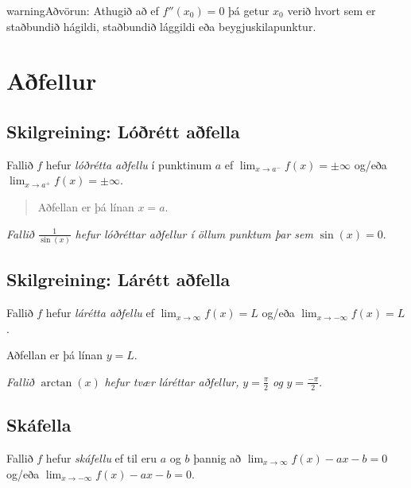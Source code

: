 \documentclass[a4paper,10pt,icelandic]{sphinxmanual}
\begin{document}
\begin{notice}{warning}{Aðvörun:}
Athugið að ef \(f''(x_0)=0\) þá getur \(x_0\) verið hvort sem er
staðbundið hágildi, staðbundið lággildi eða beygjuskilapunktur.
\end{notice}


\section{Aðfellur}
\label{kafli05:afellur}\label{kafli05:index-4}

\subsection{Skilgreining: Lóðrétt aðfella}
\label{kafli05:skilgreining-lorett-afella}
Fallið \(f\) hefur \emph{lóðrétta aðfellu} í punktinum \(a\) ef
\(\lim_{x\to a^-} f(x) = \pm \infty\) og/eða
\(\lim_{x\to a^+} f(x) = \pm \infty\).
\begin{quote}

Aðfellan er þá línan \(x=a\).
\end{quote}


\emph{Fallið} \(\frac{1}{\sin(x)}\) \emph{hefur lóðréttar aðfellur í öllum punktum þar sem} \(\sin(x)=0\).


\subsection{Skilgreining: Lárétt aðfella}
\label{kafli05:skilgreining-larett-afella}
Fallið \(f\) hefur \emph{lárétta aðfellu} ef
\(\lim_{x\to \infty} f(x) = L\) og/eða
\(\lim_{x\to -\infty} f(x) = L\).

Aðfellan er þá línan \(y=L\).


\emph{Fallið} \(\arctan(x)\) \emph{hefur tvær láréttar aðfellur,} \(y=\frac{\pi}{2}\) \emph{og} \(y=\frac{-\pi}{2}\).


\subsection{Skáfella}
\label{kafli05:skafella}
Fallið \(f\) hefur \emph{skáfellu} ef til eru \(a\) og \(b\)
þannig að \(\lim_{x\to \infty} f(x) -ax-b = 0\) og/eða
\(\lim_{x\to -\infty} f(x) -ax-b= 0\).
\end{document}
